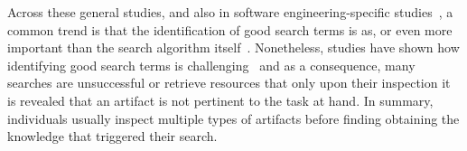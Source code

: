 Across these general studies, and also in software engineering-specific studies~\cite{Starke2009, Brandt2009a, DeGraaf2014},
a common trend is that the identification of good search terms is as, or even more
important than the search algorithm itself~\cite{Kevic2014}. 
Nonetheless, 
studies have shown how identifying good search terms is challenging~\cite{novotny2004don, Haiduc2013} and 
as a consequence, many searches are unsuccessful or retrieve resources that only upon 
their inspection it is revealed that an artifact is not pertinent to the task at hand.
In summary, individuals usually inspect multiple types of artifacts before
finding obtaining the knowledge that triggered their search. 





